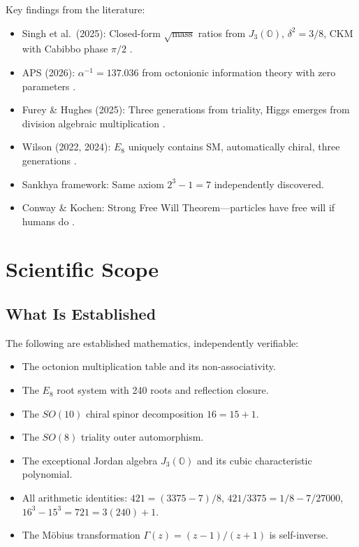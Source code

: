 \documentclass[11pt]{article}
\begin{document}
Key findings from the literature:
\begin{itemize}
\item Singh et al.\ (2025): Closed-form $\sqrt{\text{mass}}$ ratios from $J_3(\mathbb{O})$, $\delta^2 = 3/8$, CKM with Cabibbo phase $\pi/2$ \cite{singh2025j3}.
\item APS (2026): $\alpha^{-1} = 137.036$ from octonionic information theory with zero parameters \cite{aps2026alpha}.
\item Furey \& Hughes (2025): Three generations from triality, Higgs emerges from division algebraic multiplication \cite{furey2025generations}.
\item Wilson (2022, 2024): $E_8$ uniquely contains SM, automatically chiral, three generations \cite{wilson2022e8, wilson2024e8}.
\item Sankhya framework: Same axiom $2^3 - 1 = 7$ independently discovered.
\item Conway \& Kochen: Strong Free Will Theorem---particles have free will if humans do \cite{conway2009strong}.
\end{itemize}

\section{Scientific Scope}

\subsection{What Is Established}

The following are established mathematics, independently verifiable:
\begin{itemize}
\item The octonion multiplication table and its non-associativity.
\item The $E_8$ root system with 240 roots and reflection closure.
\item The $SO(10)$ chiral spinor decomposition $16 = 15 + 1$.
\item The $SO(8)$ triality outer automorphism.
\item The exceptional Jordan algebra $J_3(\mathbb{O})$ and its cubic characteristic polynomial.
\item All arithmetic identities: $421 = (3375-7)/8$, $421/3375 = 1/8 - 7/27000$, $16^3 - 15^3 = 721 = 3(240)+1$.
\item The M\"obius transformation $\Gamma(z) = (z-1)/(z+1)$ is self-inverse.
\end{itemize}
\end{document}
